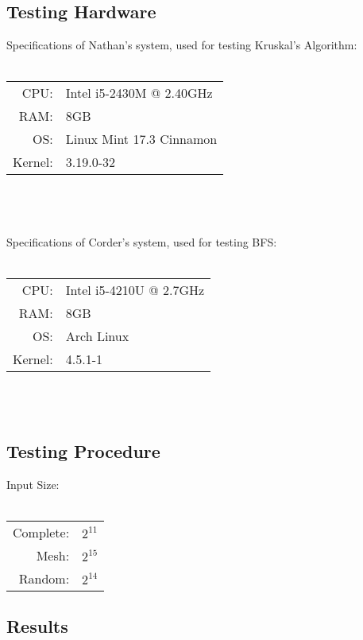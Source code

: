 \documentclass[titlepage]{article}
\begin{document}
\begin{multicols*}{2}
            \subsection{Testing Hardware}
                Specifications of Nathan's system, used for testing Kruskal's Algorithm: \\ \\
                \begin{tabular}{r l}
                CPU:    & Intel i5-2430M @ 2.40GHz \\
                RAM:    & 8GB \\
                OS:     & Linux Mint 17.3 Cinnamon \\
                Kernel: & 3.19.0-32 \\
                \end{tabular} \\ \\ \\
                \noindent
                Specifications of Corder's system, used for testing BFS: \\ \\
                \begin{tabular}{r l}
                CPU:    & Intel i5-4210U @ 2.7GHz \\
                RAM:    & 8GB \\
                OS:     & Arch Linux \\
                Kernel: & 4.5.1-1 \\
                \end{tabular} \\ \\
            \subsection{Testing Procedure}
                Input Size: \\ \\
                \begin{tabular}{r l}
                Complete:   & $2^{11}$ \\
                Mesh:       & $2^{15}$ \\
                Random:     & $2^{14}$ \\
                \end{tabular}

            \subsection{Results}

\end{multicols*}
\end{document}
